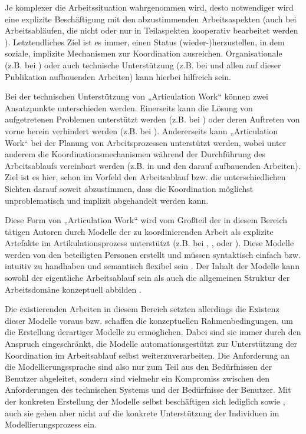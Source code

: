 Je komplexer die Arbeitssituation wahrgenommen wird, desto notwendiger wird eine explizite Beschäftigung mit den abzustimmenden Arbeitsaspekten (auch bei Arbeitsabläufen, die nicht oder nur in Teilaspekten kooperativ bearbeitet werden \citep{Fjuk97}). Letztendliches Ziel ist es immer, einen Status (wieder-)herzustellen, in dem soziale, implizite Mechanismen zur Koordination ausreichen. Organisationale (z.B. bei \citep{Grinter96}) oder auch technische Unterstützung (z.B. bei \citep{Schmidt00} und allen auf dieser Publikation aufbauenden Arbeiten) kann hierbei hilfreich sein.

Bei der technischen Unterstützung von „Articulation Work“ können zwei Ansatzpunkte unterschieden werden. Einerseits kann die Lösung von aufgetretenen Problemen unterstützt werden (z.B. bei \citep{Grinter96}) oder deren Auftreten von vorne herein verhindert werden (z.B. bei \citep{Raposo04}). Andererseits kann „Articulation Work“ bei der Planung von Arbeitsprozessen unterstützt werden, wobei unter anderem die Koordinationsmechanismen während der Durchführung des Arbeitsablaufs vereinbart werden (z.B. in \citep{Sarini02a} und den darauf aufbauenden Arbeiten). Ziel ist es hier, schon im Vorfeld den Arbeitsablauf bzw. die unterschiedlichen Sichten darauf soweit abzustimmen, dass die Koordination möglichst unproblematisch und implizit abgehandelt werden kann.

Diese Form von „Articulation Work“ wird vom Großteil der in diesem Bereich tätigen Autoren durch Modelle der zu koordinierenden Arbeit als explizite Artefakte im Artikulationsprozess unterstützt (z.B. bei \citep{Divitini00}, \citep{Sarini02}, \citep{Raposo04} oder \citep{Jorgensen04}). Diese Modelle werden von den beteiligten Personen erstellt und müssen syntaktisch einfach bzw. intuitiv zu handhaben und semantisch flexibel sein \citep{Herrmann02} \citep{Jorgensen04}. Der Inhalt der Modelle kann sowohl der eigentliche Arbeitsablauf sein \citep{Divitini00} als auch die allgemeinen Struktur der Arbeitsdomäne konzeptuell abbilden \citep{Sarini02}. 

Die \wichtig existierenden Arbeiten in diesem Bereich setzten allerdings die Existenz dieser Modelle voraus bzw. schaffen die konzeptuellen Rahmenbedingungen, um die Erstellung derartiger Modelle zu ermöglichen. Dabei sind sie immer durch den Anspruch eingeschränkt, die Modelle automationsgestützt zur Unterstützung der Koordination im Arbeitsablauf selbst weiterzuverarbeiten. Die Anforderung an die Modellierungssprache sind also nur zum Teil aus den Bedürfnissen der Benutzer abgeleitet, sondern sind vielmehr ein Kompromiss zwischen den Anforderungen des technischen Systems und der Bedürfnisse der Benutzer. Mit der konkreten Erstellung der Modelle selbst beschäftigen sich lediglich \citet{Herrmann02} sowie \citet{Jorgensen04}, auch sie gehen aber nicht auf die konkrete Unterstützung der Individuen im Modellierungsprozess ein.

